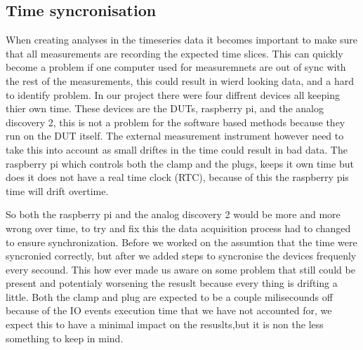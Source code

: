 \subsection{Time syncronisation}
When creating analyses in the timeseries data it becomes important to make sure that all measurements are recording the expected time slices. This can quickly become a problem if one computer used for measuremnets are out of sync with the rest of the measurements, this could result in wierd looking data, and a hard to identify problem. In our project there were four diffrent devices all keeping thier own time. These devices are the DUTs, raspberry pi, and the analog discovery 2, this is not a problem for the software based methods because they run on the DUT itself. The external measurement instrument however need to take this into account as small driftes in the time could result in bad data. The raspberry pi which controls both the clamp and the plugs, keeps it own time but does it does not have a real time clock (RTC)\cite{RTCRasp}, because of this the raspberry pis time will drift overtime. 

So both the raspberry pi and the analog discovery 2 would be more and more wrong over time, to try and fix this the data acquisition process had to changed to ensure synchronization. Before we worked on the assumtion that the time were syncronied correctly, but after we added steps to syncronise the devices frequenly every secound. This how ever made us aware on some problem that still could be present and potentialy worsening the resuslt because every thing is drifting a little. Both the clamp and plug are expected to be a couple milisecounds off because of the IO events execution time that we have not accounted for, we expect this to have a minimal impact on the resuslts,but it is non the less something to keep in mind.